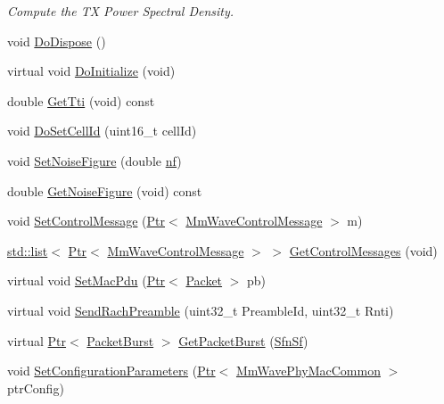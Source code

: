 \begin{DoxyCompactItemize}
\begin{DoxyCompactList}\small\item\em Compute the TX Power Spectral Density. \end{DoxyCompactList}\item 
void \hyperlink{classns3_1_1MmWavePhy_ab7265f502260e059bc7c4c763963fe02}{Do\+Dispose} ()
\item 
virtual void \hyperlink{classns3_1_1MmWavePhy_a4a5afbb66250562604dca60368ab187b}{Do\+Initialize} (void)
\item 
double \hyperlink{classns3_1_1MmWavePhy_a0cece47b3034d3899b9f0f4f0a26d654}{Get\+Tti} (void) const 
\item 
void \hyperlink{classns3_1_1MmWavePhy_a86d0ae4f2e18b6b6784fa45c5c13144f}{Do\+Set\+Cell\+Id} (uint16\+\_\+t cell\+Id)
\item 
void \hyperlink{classns3_1_1MmWavePhy_a75ed96962f67af7d16ee2b6992ec042a}{Set\+Noise\+Figure} (double \hyperlink{lte__link__budget__x2__handover__measures_8m_a9cd8534b44434622d5c8bbb1e3f3ff62}{nf})
\item 
double \hyperlink{classns3_1_1MmWavePhy_ade17d33d06eea7205da2bdab6e5bb276}{Get\+Noise\+Figure} (void) const 
\item 
void \hyperlink{classns3_1_1MmWavePhy_a62c90b93e1ee4ebbfeab863c407debf0}{Set\+Control\+Message} (\hyperlink{classns3_1_1Ptr}{Ptr}$<$ \hyperlink{classns3_1_1MmWaveControlMessage}{Mm\+Wave\+Control\+Message} $>$ m)
\item 
\hyperlink{openflow-interface_8h_afd9bcfa176617760671b67580f536fa7}{std\+::list}$<$ \hyperlink{classns3_1_1Ptr}{Ptr}$<$ \hyperlink{classns3_1_1MmWaveControlMessage}{Mm\+Wave\+Control\+Message} $>$ $>$ \hyperlink{classns3_1_1MmWavePhy_a3ac83b01351f502d4b781ebf3216b8cc}{Get\+Control\+Messages} (void)
\item 
virtual void \hyperlink{classns3_1_1MmWavePhy_a353fc123dbf0c1bf30ecbe3abebaaa4c}{Set\+Mac\+Pdu} (\hyperlink{classns3_1_1Ptr}{Ptr}$<$ \hyperlink{classns3_1_1Packet}{Packet} $>$ pb)
\item 
virtual void \hyperlink{classns3_1_1MmWavePhy_aa4099fa75efba4d0909a6dbce251bdf1}{Send\+Rach\+Preamble} (uint32\+\_\+t Preamble\+Id, uint32\+\_\+t Rnti)
\item 
virtual \hyperlink{classns3_1_1Ptr}{Ptr}$<$ \hyperlink{classns3_1_1PacketBurst}{Packet\+Burst} $>$ \hyperlink{classns3_1_1MmWavePhy_acc47ea975529c5c4ae3ad138fb3f4278}{Get\+Packet\+Burst} (\hyperlink{structns3_1_1SfnSf}{Sfn\+Sf})
\item 
void \hyperlink{classns3_1_1MmWavePhy_ad275310cfd6a87fdabeb41116c3ca6cd}{Set\+Configuration\+Parameters} (\hyperlink{classns3_1_1Ptr}{Ptr}$<$ \hyperlink{classns3_1_1MmWavePhyMacCommon}{Mm\+Wave\+Phy\+Mac\+Common} $>$ ptr\+Config)

\end{DoxyCompactItemize}
